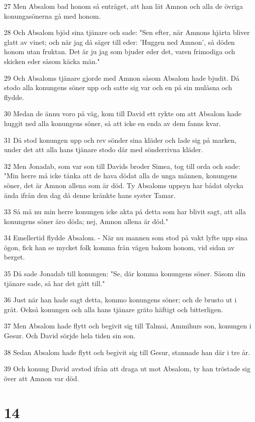 \par 27 Men Absalom bad honom så enträget, att han lät Amnon och alla de övriga konungasönerna gå med honom.
\par 28 Och Absalom bjöd sina tjänare och sade: "Sen efter, när Amnons hjärta bliver glatt av vinet; och när jag då säger till eder: 'Huggen ned Amnon', så döden honom utan fruktan. Det är ju jag som bjuder eder det, varen frimodiga och skicken eder såsom käcka män."
\par 29 Och Absaloms tjänare gjorde med Amnon såsom Absalom hade bjudit. Då stodo alla konungens söner upp och satte sig var och en på sin mulåsna och flydde.
\par 30 Medan de ännu voro på väg, kom till David ett rykte om att Absalom hade huggit ned alla konungens söner, så att icke en enda av dem fanns kvar.
\par 31 Då stod konungen upp och rev sönder sina kläder och lade sig på marken, under det att alla hans tjänare stodo där med sönderrivna kläder.
\par 32 Men Jonadab, som var son till Davids broder Simea, tog till orda och sade: "Min herre må icke tänka att de hava dödat alla de unga männen, konungens söner, det är Amnon allena som är död. Ty Absaloms uppsyn har bådat olycka ända ifrån den dag då denne kränkte hans syster Tamar.
\par 33 Så må nu min herre konungen icke akta på detta som har blivit sagt, att alla konungens söner äro döda; nej, Amnon allena är död."
\par 34 Emellertid flydde Absalom. - När nu mannen som stod på vakt lyfte upp sina ögon, fick han se mycket folk komma från vägen bakom honom, vid sidan av berget.
\par 35 Då sade Jonadab till konungen: "Se, där komma konungens söner. Såsom din tjänare sade, så har det gått till."
\par 36 Just när han hade sagt detta, kommo konungens söner; och de brusto ut i gråt. Också konungen och alla hans tjänare gräto häftigt och bitterligen.
\par 37 Men Absalom hade flytt och begivit sig till Talmai, Ammihurs son, konungen i Gesur. Och David sörjde hela tiden sin son.
\par 38 Sedan Absalom hade flytt och begivit sig till Gesur, stannade han där i tre år.
\par 39 Och konung David avstod ifrån att draga ut mot Absalom, ty han tröstade sig över att Amnon var död.

\chapter{14}

